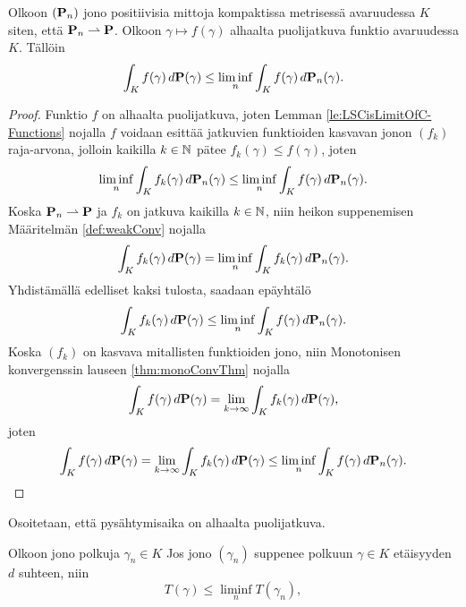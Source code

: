 \documentclass[12pt,oneside,a4paper]{amsbook} %
\begin{document}
\begin{lemma}\label{le:fdPLeLiminf}
    Olkoon $(\P_n)$ jono positiivisia mittoja kompaktissa metrisessä avaruudessa $K$ siten, että $\P_n \rightharpoonup \P$. Olkoon $\gamma \mapsto f(\gamma)$ alhaalta puolijatkuva funktio avaruudessa $K$. Tällöin
    \begin{equation*}
        \int_K f(\gamma) \, d\P(\gamma) \le \liminf_n \int_K f(\gamma) \, d\P_n(\gamma).
    \end{equation*}
\end{lemma}
\begin{proof}
    Funktio $f$ on alhaalta puolijatkuva, joten Lemman \ref{le:LSCisLimitOfC-Functions} nojalla $f$ voidaan esittää jatkuvien funktioiden kasvavan jonon $(f_k)$ raja-arvona, jolloin kaikilla $k \in \N$ pätee $f_k(\gamma) \le f(\gamma)$, joten
    \begin{equation*}
        \liminf_n \int_K f_k(\gamma) \, d\P_n(\gamma) \le \liminf_n \int_K f(\gamma)\, d\P_n(\gamma).
    \end{equation*}
    Koska $\P_n \rightharpoonup \P$ ja $f_k$ on jatkuva kaikilla $k \in \N$, niin heikon suppenemisen Määritelmän \ref{def:weakConv} nojalla
    \begin{equation*}
        \int_K f_k(\gamma) \, d\P(\gamma) = \liminf_{n} \int_K f_k(\gamma)\, d\P_n(\gamma).
    \end{equation*}
    Yhdistämällä edelliset kaksi tulosta, saadaan epäyhtälö
    \begin{equation*}\label{eq:mainThmMonoConv}
        \int_K f_k(\gamma) \, d\P(\gamma) \le \liminf_n \int_K f(\gamma) \, d\P_n(\gamma).
    \end{equation*}
    Koska $(f_k)$ on kasvava mitallisten funktioiden jono, niin Monotonisen konvergenssin lauseen \ref{thm:monoConvThm} nojalla 
    \begin{equation*}
        \int_K f(\gamma) \, d\P(\gamma) = \lim_{k\to \infty}\int_K f_k(\gamma)\, d\P(\gamma), 
    \end{equation*}
    joten
    \begin{equation*}
        \int_K f(\gamma) \, d\P(\gamma) = \lim_{k\to \infty}\int_K f_k(\gamma)\, d\P(\gamma)  \le \liminf_n \int_K f(\gamma) \, d\P_n(\gamma).
    \end{equation*}
\end{proof}
Osoitetaan, että pysähtymisaika on alhaalta puolijatkuva.
\begin{lemma}\label{le:pysahtymisajan&pituudenLSC}
    Olkoon jono polkuja $\gamma_n \in K$ Jos jono $(\gamma_n)$ suppenee polkuun $\gamma \in K$ etäisyyden $d$ suhteen, niin
    \begin{equation*}
        T(\gamma) \le \liminf_n T(\gamma_n),
    \end{equation*}
\end{lemma}
\end{document}
